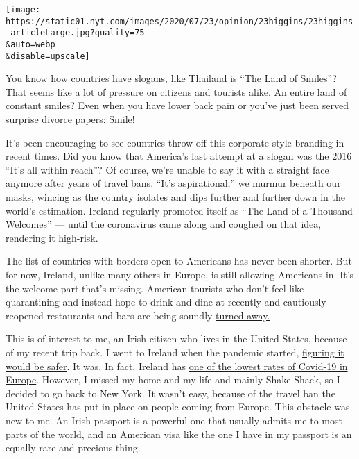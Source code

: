 \texttt{[image: https://static01.nyt.com/images/2020/07/23/opinion/23higgins/23higgins-articleLarge.jpg?quality=75\\\&auto=webp\\\&disable=upscale]}

You know how countries have slogans, like Thailand is ``The Land of
Smiles''? That seems like a lot of pressure on citizens and tourists
alike. An entire land of constant smiles? Even when you have lower back
pain or you've just been served surprise divorce papers: Smile!

It's been encouraging to see countries throw off this corporate-style
branding in recent times. Did you know that America's last attempt at a
slogan was the 2016 ``It's all within reach''? Of course, we're unable
to say it with a straight face anymore after years of travel bans.
``It's aspirational,'' we murmur beneath our masks, wincing as the
country isolates and dips further and further down in the world's
estimation. Ireland regularly promoted itself as ``The Land of a
Thousand Welcomes'' --- until the coronavirus came along and coughed on
that idea, rendering it high-risk.

The list of countries with borders open to Americans has never been
shorter. But for now, Ireland, unlike many others in Europe, is still
allowing Americans in. It's the welcome part that's missing. American
tourists who don't feel like quarantining and instead hope to drink and
dine at recently and cautiously reopened restaurants and bars are being
soundly
\href{https://www.nytimes.com/2020/07/14/world/europe/Ireland-americans-break-quarantine.html}{turned
away.}

This is of interest to me, an Irish citizen who lives in the United
States, because of my recent trip back. I went to Ireland when the
pandemic started,
\href{https://www.nytimes.com/2020/04/11/opinion/sunday/coronavirus-isolation-ireland.html}{figuring
it would be safer}. It was. In fact, Ireland has
\href{https://www.irishtimes.com/news/health/ireland-has-lowest-current-incidence-of-covid-19-in-western-europe-1.4294642}{one
of the lowest rates of Covid-19 in Europe}. However, I missed my home
and my life and mainly Shake Shack, so I decided to go back to New York.
It wasn't easy, because of the travel ban the United States has put in
place on people coming from Europe. This obstacle was new to me. An
Irish passport is a powerful one that usually admits me to most parts of
the world, and an American visa like the one I have in my passport is an
equally rare and precious thing.

